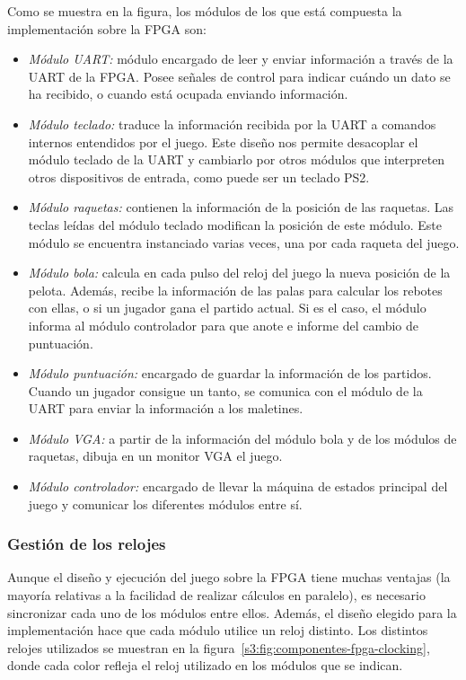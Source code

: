 Como se muestra en la figura, los módulos de los que está compuesta la
implementación sobre la FPGA son:
\begin{itemize}
\item \emph{Módulo UART:} módulo encargado de leer y enviar información a
  través de la UART de la FPGA. Posee señales de control para indicar
  cuándo un dato se ha recibido, o cuando está ocupada enviando
  información.
\item \emph{Módulo teclado:} traduce la información recibida por la UART a
  comandos internos entendidos por el juego. Este diseño nos permite
  desacoplar el módulo teclado de la UART y cambiarlo por otros módulos
  que interpreten otros dispositivos de entrada, como puede ser un teclado
  PS2.
\item \emph{Módulo raquetas:} contienen la información de la posición de
  las raquetas. Las teclas leídas del módulo teclado modifican la posición
  de este módulo. Este módulo se encuentra instanciado varias veces, una
  por cada raqueta del juego.
\item \emph{Módulo bola:} calcula en cada pulso del reloj del juego la
  nueva posición de la pelota. Además, recibe la información de las palas
  para calcular los rebotes con ellas, o si un jugador gana el partido
  actual. Si es el caso, el módulo informa al módulo controlador para que
  anote e informe del cambio de puntuación.
\item \emph{Módulo puntuación:} encargado de guardar la información de los
  partidos. Cuando un jugador consigue un tanto, se comunica con el módulo
  de la UART para enviar la información a los maletines.
\item \emph{Módulo VGA:} a partir de la información del módulo bola y de
  los módulos de raquetas, dibuja en un monitor VGA el juego.
\item \emph{Módulo controlador:} encargado de llevar la máquina de estados
  principal del juego y comunicar los diferentes módulos entre sí.
\end{itemize}

\subsubsection{Gestión de los relojes}
\label{s3:subsubsec:clocking}
Aunque el diseño y ejecución del juego sobre la FPGA tiene muchas ventajas
(la mayoría relativas a la facilidad de realizar cálculos en paralelo), es
necesario sincronizar cada uno de los módulos entre ellos. Además, el
diseño elegido para la implementación hace que cada módulo utilice un reloj
distinto. Los distintos relojes utilizados se muestran en la
figura~\ref{s3:fig:componentes-fpga-clocking}, donde cada color refleja el
reloj utilizado en los módulos que se indican.

